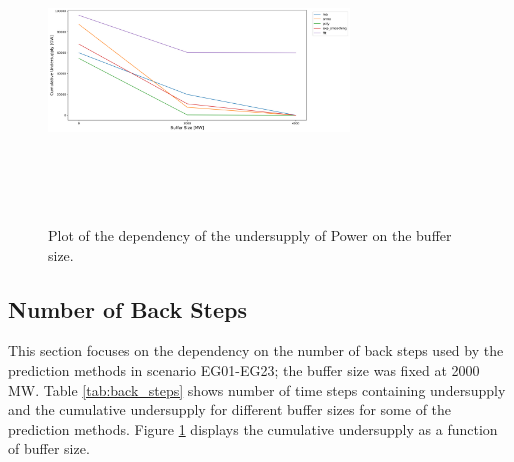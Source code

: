\documentclass[11pt,letterpaper]{article}
\begin{document}
\begin{figure}[h!]
	\centering
	\includegraphics[width=8cm,height=8cm,keepaspectratio]{23-buff.png}
	\caption{Plot of the dependency of the undersupply of Power on the buffer size.}
	\label{buffer_dep}
\end{figure}

\subsection{Number of Back Steps}

This section focuses on the dependency on the number of back steps used by the prediction methods in scenario EG01-EG23; the buffer size was fixed at 2000 MW. Table \ref{tab:back_steps} shows number of time steps containing undersupply and the cumulative undersupply for different buffer sizes for some of the prediction methods. Figure \ref{buffer_dep} displays the cumulative undersupply as a function of buffer size.
\end{document}
